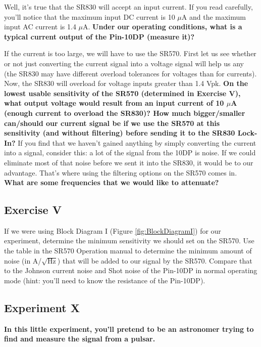 \documentclass{../lab}
\begin{document}
Well, it's true that the SR830 will accept an input current. If you read carefully, you'll notice that the maximum input DC current is 10 $\mu$A and the maximum input AC current is 1.4 $\mu$A. \textbf{Under our operating conditions, what is a typical current output of the Pin-10DP (measure it)?}

If the current is too large, we will have to use the SR570. First let us see whether or not just converting the current signal into a voltage signal will help us any (the SR830 may have different overload tolerances for voltages than for currents). Now, the SR830 will overload for voltage inputs greater than 1.4 Vpk. \textbf{On the lowest usable sensitivity of the SR570 (determined in Exercise V), what output voltage would result from an input current of 10 $\mu$A (enough current to overload the SR830)? How much bigger/smaller can/should our current signal be if we use the SR570 at this sensitivity (and without filtering) before sending it to the SR830 Lock-In?} If you find that we haven't gained anything by simply converting the current into a signal, consider this: a lot of the signal from the 10DP is noise. If we could eliminate most of that noise before we sent it into the SR830, it would be to our advantage. That's where using the filtering options on the SR570 comes in. \textbf{What are some frequencies that we would like to attenuate?}

\subsection{Exercise V}

If we were using Block Diagram I (Figure \ref{fig:BlockDiagramI}) for our experiment, determine the minimum sensitivity we should set on the SR570. Use the table in the SR570 Operation manual to determine the minimum amount of noise (in A/$\sqrt{\text{Hz}}$) that will be added to our signal by the SR570. Compare that to the Johnson current noise and Shot noise of the Pin-10DP in normal operating mode (hint: you'll need to know the resistance of the Pin-10DP).

\subsection{Experiment X}

\textbf{In this little experiment, you'll pretend to be an astronomer trying to find and measure the signal from a pulsar.}
\end{document}
